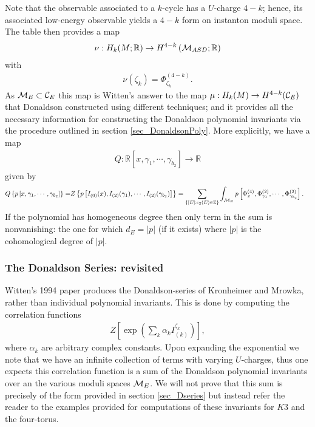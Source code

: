 \documentclass[12pt, onecolumn]{article}
\begin{document}
Note that the observable associated to a $k$-cycle has a $U$-charge $4-k$; hence, its associated low-energy observable yields a $4-k$ form on instanton moduli space.  The table then provides a map
\begin{align*}
\nu: H_{k}(M; \mathbb{R}) \rightarrow H^{4-k}\left({\cal M}_{ASD};\mathbb{R}\right)
\end{align*}
with
\begin{align*}
\nu(\zeta_{k})=\Phi^{(4-k)}_{\zeta_{k}}.
\end{align*}
As ${\cal M}_{E} \subset {\cal C}_{E}$ this map is Witten's answer to the map $\mu:H_{k}(M) \rightarrow H^{4-k}({\cal C}_{E})$ that Donaldson constructed using different techniques; and it provides all the necessary information for constructing the Donaldson polynomial invariants via the procedure outlined in section \ref{sec_DonaldsonPoly}.  More explicitly, we have a map
\begin{align*}
Q: \mathbb{R}[x,\gamma_{1},\cdots,\gamma_{b_{2}}] \rightarrow \mathbb{R}
\end{align*}
given by
\begin{align*}
Q\left\{p\left[x,\gamma_{1},\cdots,\gamma_{b_{2}}\right]\right\}=&Z\left\{p\left[I_{(0)}(x),I_{(2)}(\gamma_{1}),\cdots,I_{(2)}(\gamma_{b_{2}})\right]\right\}
=\sum_{\left\{[E]:c_{2}(E) \in \mathbb{Z}\right\}} \int_{{\cal M}_{E}}p\left[\Phi_{x}^{(4)},\Phi_{\gamma_{1}}^{(2)},\cdots,\Phi_{\gamma_{b_2}}^{(2)}\right].
\end{align*}
If the polynomial has homogeneous degree then only term in the sum is nonvanishing: the one for which $d_{E}=|p|$ (if it exists) where $|p|$ is the cohomological degree of $|p|$.

\subsubsection{The Donaldson Series: revisited}
Witten's 1994 paper \cite{Witten_1994} produces the Donaldson-series of Kronheimer and Mrowka, rather than individual polynomial invariants.  This is done by computing the correlation functions
\begin{align*}
Z\left[\exp\left(\sum_{k}\alpha_{k}I_{(k)}^{\zeta_{k}}\right)\right],
\end{align*}
where $\alpha_{k}$ are arbitrary complex constants.  Upon expanding the exponential we note that we have an infinite collection of terms with varying $U$-charges, thus one expects this correlation function is a sum of the Donaldson polynomial invariants over an the various moduli spaces ${\cal M}_{E}$.  We will not prove that this sum is precisely of the form provided in section \ref{sec_Dseries} but instead refer the reader to the examples provided for computations of these invariants for $K3$ and the four-torus.
\end{document}
